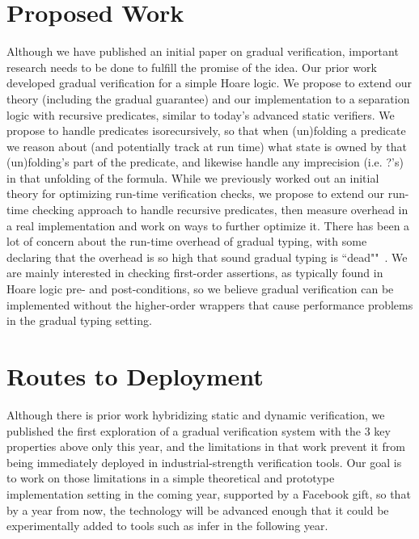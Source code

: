 \documentclass[10pt,twocolumn]{article}
\begin{document}
\begin{sloppypar}
\section{Proposed Work}

Although we have published an initial paper on gradual verification, important research needs to be done to fulfill the promise of the idea.  Our prior work developed gradual verification for a simple Hoare logic.
We propose to extend our theory (including the gradual guarantee) and our implementation to a separation logic with recursive predicates, similar to today's advanced static verifiers.  We propose to handle predicates isorecursively, so that when (un)folding a predicate we reason about (and potentially track at run time) what state is owned by that (un)folding's part of the predicate, and likewise handle any imprecision (i.e. ?'s) in that unfolding of the formula. While we previously worked out an initial theory for optimizing run-time verification checks, we propose to extend our run-time checking approach to handle recursive predicates, then measure overhead in a real implementation and work on ways to further optimize it.  There has been a lot of concern about the run-time overhead of gradual typing, with some declaring that the overhead is so high that sound gradual typing is ``dead""~\cite{Takikawa:2016:SGT:2837614.2837630}.  We are mainly interested in checking first-order assertions, as typically found in Hoare logic pre- and post-conditions, so we believe gradual verification can be implemented without the higher-order wrappers that cause performance problems in the gradual typing setting.

\section{Routes to Deployment}

Although there is prior work hybridizing static and dynamic verification, we published the first exploration of a gradual verification system with the 3 key properties above only this year, and the limitations in that work prevent it from being immediately deployed in industrial-strength verification tools.  Our goal is to work on those limitations in a simple theoretical and prototype implementation setting in the coming year, supported by a Facebook gift, so that by a year from now, the technology will be advanced enough that it could be experimentally added to tools such as infer in the following year.


\end{sloppypar}
\end{document}
